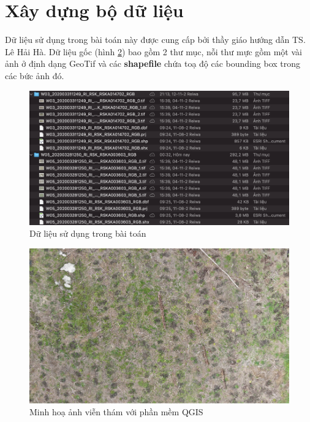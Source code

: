 \documentclass[a4paper, 12pt]{report}
\begin{document}
\section{Xây dựng bộ dữ liệu} 
Dữ liệu sử dụng trong bài toán này được cung cấp bởi thầy giáo hướng dẫn TS.  Lê Hải Hà.  Dữ liệu gốc (hình \ref{fig:1a}) bao gồm 2 thư mục,  nỗi thư mực gồm một vài ảnh ở định dạng GeoTif và các \textbf{shapefile} chứa toạ độ các bounding box trong các bức ảnh đó.
 \begin{figure}[!htb]
	\centering
	\includegraphics[width=1\linewidth]{Images/data_folder}
	\caption{Dữ liệu sử dụng trong bài toán}
	\label{fig:data_folder}
\end{figure}

 \begin{figure}[!htb]
	\centering
	\includegraphics[width=1\linewidth]{Images/qgisa}
	\caption{Minh hoạ ảnh viễn thám với phần mềm QGIS} 
	\label{fig:1a}
\end{figure}
\end{document}
